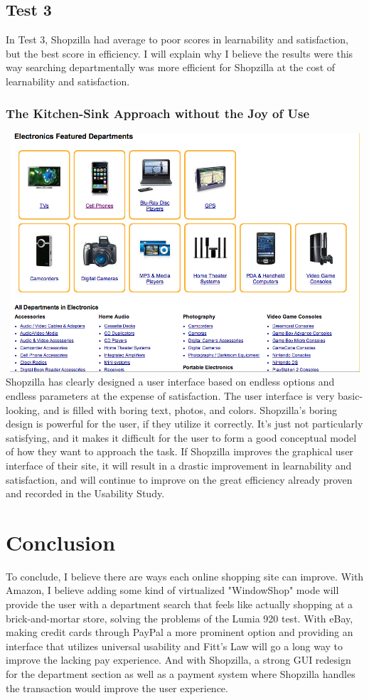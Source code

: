 \documentclass[11pt, oneside]{article}   	%
\begin{document}
\subsection{Test 3}
In Test 3, Shopzilla had average to poor scores in learnability and satisfaction, but the best score in efficiency. I will explain why I believe the results were this way searching departmentally was more efficient for Shopzilla at the cost of learnability and satisfaction.
\subsubsection{The Kitchen-Sink Approach without the Joy of Use}
\includegraphics[width=6in, height=3.5in]{Shopzilla1}
Shopzilla has clearly designed a user interface based on endless options and endless parameters at the expense of satisfaction. The user interface is very basic-looking, and is filled with boring text, photos, and colors. Shopzilla's boring design is powerful for the user, if they utilize it correctly. It's just not particularly satisfying, and it makes it difficult for the user to form a good conceptual model of how they want to approach the task. If Shopzilla improves the graphical user interface of their site, it will result in a drastic improvement in learnability and satisfaction, and will continue to improve on the great efficiency already proven and recorded in the Usability Study.
\section{Conclusion}
To conclude, I believe there are ways each online shopping site can improve. With Amazon, I believe adding some kind of virtualized "WindowShop" mode will provide the user with a department search that feels like actually shopping at a brick-and-mortar store, solving the problems of the Lumia 920 test. With eBay, making credit cards through PayPal a more prominent option and providing an interface that utilizes universal usability and Fitt's Law will go a long way to improve the lacking pay experience. And with Shopzilla, a strong GUI redesign for the department section as well as a payment system where Shopzilla handles the transaction would improve the user experience.
\end{document}
